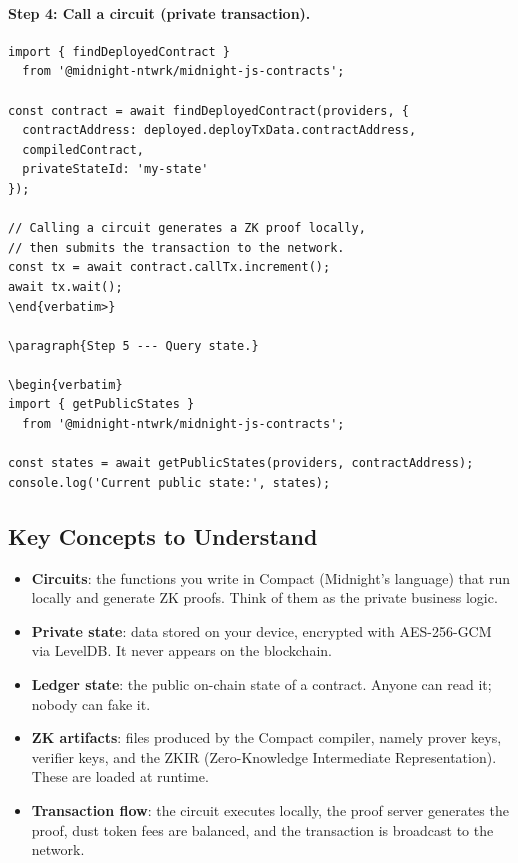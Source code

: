 \paragraph{Step 4: Call a circuit (private transaction).}

\begin{verbatim}
import { findDeployedContract }
  from '@midnight-ntwrk/midnight-js-contracts';

const contract = await findDeployedContract(providers, {
  contractAddress: deployed.deployTxData.contractAddress,
  compiledContract,
  privateStateId: 'my-state'
});

// Calling a circuit generates a ZK proof locally,
// then submits the transaction to the network.
const tx = await contract.callTx.increment();
await tx.wait();
\end{verbatim>}

\paragraph{Step 5 --- Query state.}

\begin{verbatim}
import { getPublicStates }
  from '@midnight-ntwrk/midnight-js-contracts';

const states = await getPublicStates(providers, contractAddress);
console.log('Current public state:', states);
\end{verbatim}

\subsection*{Key Concepts to Understand}

\begin{itemize}
  \item \textbf{Circuits}: the functions you write in Compact (Midnight's language) that run locally and generate ZK proofs. Think of them as the private business logic.
  \item \textbf{Private state}: data stored on your device, encrypted with AES-256-GCM via LevelDB. It never appears on the blockchain.
  \item \textbf{Ledger state}: the public on-chain state of a contract. Anyone can read it; nobody can fake it.
  \item \textbf{ZK artifacts}: files produced by the Compact compiler, namely prover keys, verifier keys, and the ZKIR (Zero-Knowledge Intermediate Representation). These are loaded at runtime.
  \item \textbf{Transaction flow}: the circuit executes locally, the proof server generates the proof, dust token fees are balanced, and the transaction is broadcast to the network.
\end{itemize}

